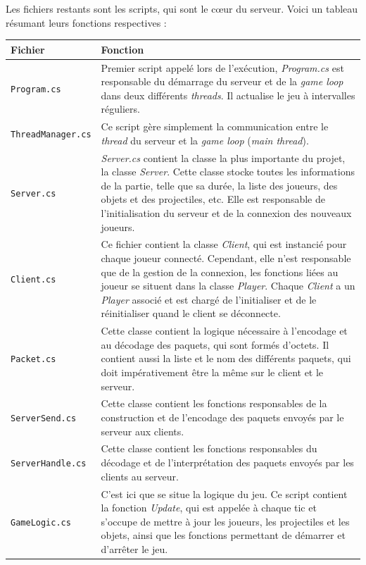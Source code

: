 \documentclass[a4paper]{article}
\begin{document}
Les fichiers restants sont les scripts, qui sont le cœur du serveur. Voici un tableau résumant leurs fonctions respectives :
\begin{center}
\begin{longtable}{|l|p{10cm}|}
    \hline
    Fichier & Fonction \\
    \hline\hline
    \texttt{Program.cs}\footnotemark[1] & Premier script appelé lors de l’exécution, \emph{Program.cs} est responsable du démarrage du serveur et de la \textit{game loop} dans deux différents \textit{threads}. Il actualise le jeu à intervalles réguliers.\\
    \hline
    \texttt{ThreadManager.cs}\footnotemark[1] & Ce script gère simplement la communication entre le \textit{thread} du serveur et la \textit{game loop} (\textit{main thread}).\\
    \hline
    \texttt{Server.cs}\footnotemark[1] & \emph{Server.cs} contient la classe la plus importante du projet, la classe \emph{Server}. Cette classe stocke toutes les informations de la partie, telle que sa durée, la liste des joueurs, des objets et des projectiles, etc. Elle est responsable de l’initialisation du serveur et de la connexion des nouveaux joueurs.\\
    \hline
    \texttt{Client.cs}\footnotemark[1] & Ce fichier contient la classe \emph{Client}, qui est instancié pour chaque joueur connecté. Cependant, elle n’est responsable que de la gestion de la connexion, les fonctions liées au joueur se situent dans la classe \emph{Player}. Chaque \emph{Client} a un \emph{Player} associé et est chargé de l'initialiser et de le réinitialiser quand le client se déconnecte.\\
    \hline
    \texttt{Packet.cs}\footnotemark[1] & Cette classe contient la logique nécessaire à l’encodage et au décodage des paquets, qui sont formés d’octets. Il contient aussi la liste et le nom des différents paquets, qui doit impérativement être la même sur le client et le serveur.\\
    \hline
    \texttt{ServerSend.cs} & Cette classe contient les fonctions responsables de la construction et de l’encodage des paquets envoyés par le serveur aux clients.\\
    \hline
    \texttt{ServerHandle.cs} & Cette classe contient les fonctions responsables du décodage et de l'interprétation des paquets envoyés par les clients au serveur.\\
    \hline
    \texttt{GameLogic.cs} & C’est ici que se situe la logique du jeu. Ce script contient la fonction \emph{Update}, qui est appelée à chaque tic et s’occupe de mettre à jour les joueurs, les projectiles et les objets, ainsi que les fonctions permettant de démarrer et d'arrêter le jeu.\\

\end{longtable}
\end{center}
\end{document}
